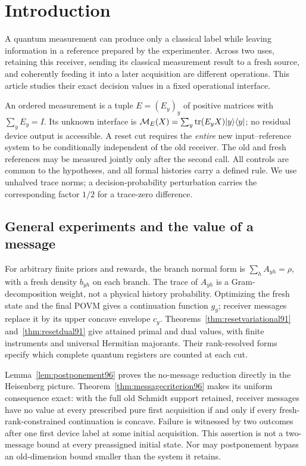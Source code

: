 \section{Introduction}
\label{sec:introduction96}
A quantum measurement can produce only a classical label while leaving
information in a reference prepared by the experimenter.  Across two
uses, retaining this receiver, sending its classical measurement result
to a fresh source, and coherently feeding it into a later acquisition
are different operations.  This article studies their exact decision
values in a fixed operational interface.

An ordered measurement is a tuple $E=(E_y)_y$ of positive matrices with
$\sum_yE_y=I$.  Its unknown interface is
$\mathcal M_E(X)=\sum_y\operatorname{tr}(E_yX)|y\rangle\langle y|$;
no residual device output is accessible.  A reset cut requires the
\emph{entire} new input--reference system to be conditionally independent
of the old receiver.  The old and fresh references may be measured
jointly only after the second call.  All controls are common to the
hypotheses, and all formal histories carry a defined rule.
We use unhalved trace norms; a decision-probability perturbation carries
the corresponding factor $1/2$ for a trace-zero difference.

\subsection{General experiments and the value of a message}
For arbitrary finite priors and rewards, the branch normal form is
$\sum_h A_{yh}=\rho$, with a fresh density $b_{yh}$ on each branch.
The trace of $A_{yh}$ is a Gram-decomposition weight, not a physical
history probability.  Optimizing the fresh state and the final POVM
gives a continuation function $g_y$; receiver messages replace it by
its upper concave envelope $c_y$.  Theorems~\ref{thm:resetvariational91}
and~\ref{thm:resetdual91} give attained primal and dual values, with
finite instruments and universal Hermitian majorants.  Their
rank-resolved forms specify which complete quantum registers are
counted at each cut.

Lemma~\ref{lem:postponement96} proves the no-message reduction directly
in the Heisenberg picture.  Theorem~\ref{thm:messagecriterion96} makes
its uniform consequence exact: with the full old Schmidt support
retained, receiver messages have no value at every prescribed pure
first acquisition if and only if every fresh-rank-constrained
continuation is concave.  Failure is witnessed by two outcomes after
one first device label at some initial acquisition.  This assertion
is not a two-message bound at every preassigned initial state.
Nor may postponement bypass an old-dimension bound smaller than the
system it retains.


